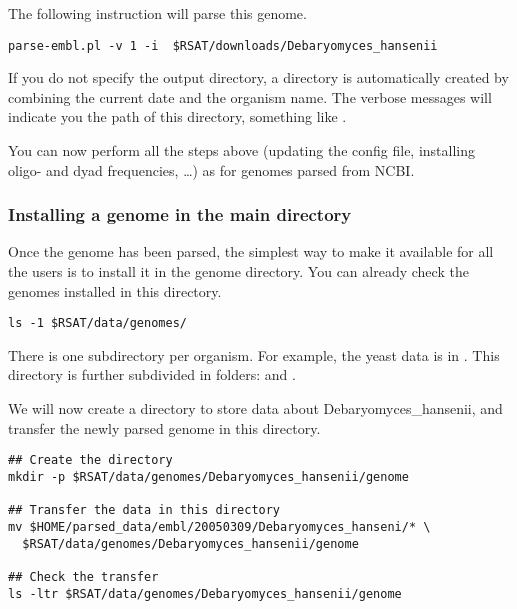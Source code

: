 The following instruction will parse this genome.

\begin{footnotesize}
\begin{verbatim}
parse-embl.pl -v 1 -i  $RSAT/downloads/Debaryomyces_hansenii
\end{verbatim}
\end{footnotesize}

If you do not specify the output directory, a directory is
automatically created by combining the current date and the organism
name.  The verbose messages will indicate you the path of this
directory, something like
.

You can now perform all the steps above (updating the config file,
installing oligo- and dyad frequencies, \ldots) as for genomes parsed
from NCBI.



\subsubsection{Installing a genome in the main \RSAT directory}

Once the genome has been parsed, the simplest way to make it available
 for all the users is to install it in the \RSAT genome directory. You
 can already check the genomes installed in this directory.

\begin{footnotesize}
\begin{verbatim}
ls -1 $RSAT/data/genomes/
\end{verbatim}
\end{footnotesize}

There is one subdirectory per organism. For example, the yeast data is
 in . This
 directory is further subdivided in folders:  and
 .

We will now create a directory to store data about
 Debaryomyces\_hansenii, and transfer the newly parsed genome in this
 directory.

\begin{footnotesize}
\begin{verbatim}
## Create the directory
mkdir -p $RSAT/data/genomes/Debaryomyces_hansenii/genome

## Transfer the data in this directory
mv $HOME/parsed_data/embl/20050309/Debaryomyces_hanseni/* \
  $RSAT/data/genomes/Debaryomyces_hansenii/genome

## Check the transfer
ls -ltr $RSAT/data/genomes/Debaryomyces_hansenii/genome
\end{verbatim}
\end{footnotesize}
